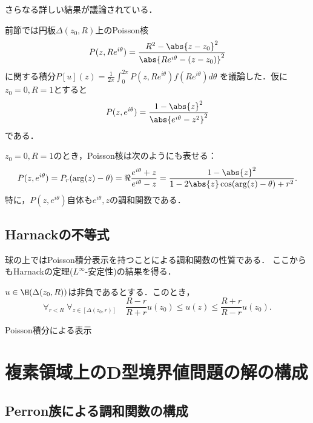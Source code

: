 \documentclass[uplatex,dvipdfmx]{jsreport}
\begin{document}
\begin{tcolorbox}[colframe=ForestGreen, colback=ForestGreen!10!white,breakable,colbacktitle=ForestGreen!40!white,coltitle=black,fonttitle=\bfseries\sffamily,
title=]
    さらなる詳しい結果が議論されている\cite{Rudin-RealandComplex}．
\end{tcolorbox}

前節では円板$\Delta(z_0,R)$上のPoisson核
\[P(z,Re^{i\theta})=\frac{R^2-\abs{z-z_0}^2}{\abs{Re^{i\theta}-(z-z_0)}^2}\]
に関する積分$P[u](z)=\frac{1}{2\pi}\int^{2\pi}_0P(z,Re^{i\theta})f(Re^{i\theta})d\theta$
を議論した．仮に$z_0=0,R=1$とすると
\[P(z,e^{i\theta})=\frac{1-\abs{z}^2}{\abs{e^{i\theta}-z^2}^2}\]
である．

\begin{proposition}\label{prop-Poisson-kernel-on-disk-of-C}
    $z_0=0,R=1$のとき，Poisson核は次のようにも表せる：
    \[P(z,e^{i\theta})=P_r(\arg(z)-\theta)=\Re\frac{e^{i\theta}+z}{e^{i\theta}-z}=\frac{1-\abs{z}^2}{1-2\abs{z}\cos(\arg(z)-\theta)+r^2}.\]
    特に，$P(z,e^{i\theta})$自体も$e^{i\theta},z$の調和関数である．
\end{proposition}

\subsection{Harnackの不等式}

\begin{tcolorbox}[colframe=ForestGreen, colback=ForestGreen!10!white,breakable,colbacktitle=ForestGreen!40!white,coltitle=black,fonttitle=\bfseries\sffamily,
title=]
    球の上ではPoisson積分表示を持つことによる調和関数の性質である．
    ここからもHarnackの定理($L^\infty$-安定性)の結果を得る．
\end{tcolorbox}

\begin{proposition}
    $u\in\H(\Delta(z_0,R))$は非負であるとする．このとき，
    \[\forall_{r<R}\;\forall_{z\in[\Delta(z_0,r)]}\quad\frac{R-r}{R+r}u(z_0)\le u(z)\le\frac{R+r}{R-r}u(z_0).\]
\end{proposition}
\begin{Proof}
    Poisson積分による表示
\end{Proof}

\section{複素領域上のD型境界値問題の解の構成}

\subsection{Perron族による調和関数の構成}
\end{document}
